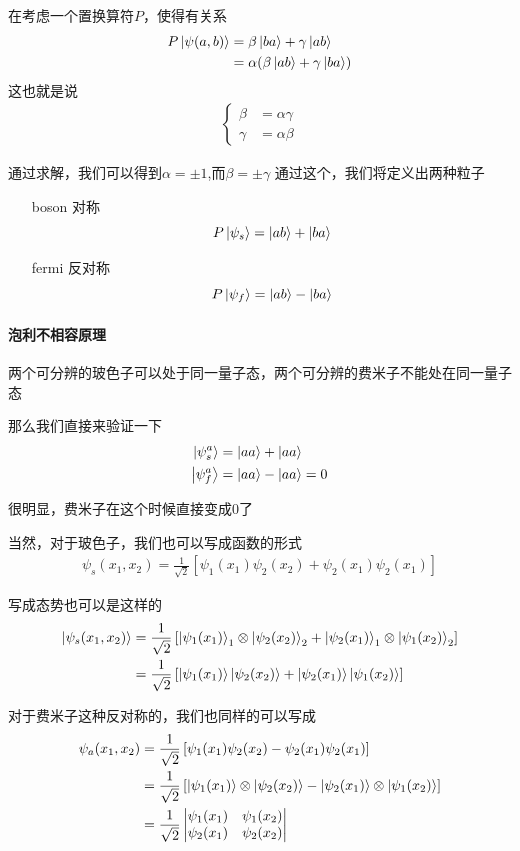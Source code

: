 \documentclass{article}
\newcommand{\vmtwo}[4]{\begin{vmatrix}#1&#2\\#3&#4\end{vmatrix}}
\begin{document}
在考虑一个置换算符$P$，使得有关系
\begin{align*}
    P\ket{\psi(a,b)}&=\beta\ket{ba}+\gamma\ket{ab}\\
    &=\alpha(\beta\ket{ab}+\gamma\ket{ba})
\end{align*}
这也就是说
\begin{align*}
    \begin{cases}
        \beta&=\alpha\gamma\\
        \gamma&=\alpha\beta
    \end{cases}
\end{align*}

通过求解，我们可以得到$\alpha=\pm 1$,而$\beta =\pm \gamma$
通过这个，我们将定义出两种粒子
\begin{enumerate}
    \item[boson] 对称\[P\ket{\psi_s}=\ket{ab}+\ket{ba}\]
    \item[fermi] 反对称\[P\ket{\psi_f}=\ket{ab}-\ket{ba}\]
\end{enumerate}

\paragraph{泡利不相容原理}
两个可分辨的玻色子可以处于同一量子态，两个可分辨的费米子不能处在同一量子态

那么我们直接来验证一下
\begin{align*}
    \ket{\psi_s^a}&=\ket{aa}+\ket{aa}\\
    \ket{\psi_f^a}&=\ket{aa}-\ket{aa}=0
\end{align*}

很明显，费米子在这个时候直接变成$0$了

当然，对于玻色子，我们也可以写成函数的形式
\begin{align*}
    \psi_{s}(x_1,x_2)=\frac{1}{\sqrt{2}}\left[\psi_1(x_1)\psi_2(x_2)+\psi_2(x_1)\psi_2(x_1)\right]
\end{align*}

写成态势也可以是这样的
\begin{align*}
    \ket{\psi_s(x_1,x_2)}&=\frac{1}{\sqrt{2}}\left[\ket{\psi_1(x_1)}_1\otimes\ket{\psi_2(x_2)}_2+\ket{\psi_2(x_1)}_1\otimes\ket{\psi_1(x_2)}_2\right]\\
    &=\frac{1}{\sqrt{2}}\left[\ket{\psi_1(x_1)}\ket{\psi_2(x_2)}+\ket{\psi_2(x_1)}\ket{\psi_1(x_2)}\right]
\end{align*}

对于费米子这种反对称的，我们也同样的可以写成
\begin{align*}
    \psi_{a}(x_1,x_2)&=\frac{1}{\sqrt{2}}\left[\psi_1(x_1)\psi_2(x_2)-\psi_2(x_1)\psi_2(x_1)\right]\\
    &=\frac{1}{\sqrt{2}}\left[\ket{\psi_1(x_1)}\otimes\ket{\psi_2(x_2)}-\ket{\psi_2(x_1)}\otimes\ket{\psi_1(x_2)}\right]\\
    &=\frac{1}{\sqrt{2}}\vmtwo{\psi_1(x_1)}{\psi_1(x_2)}{\psi_2(x_1)}{\psi_2(x_2)}
\end{align*}
\end{document}
